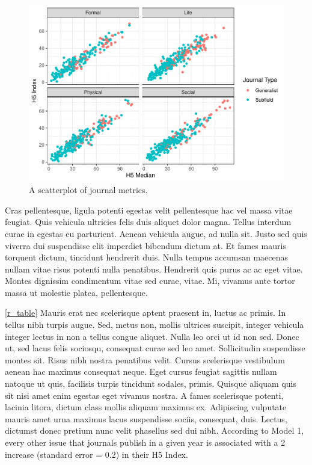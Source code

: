 \documentclass[
  12,
]{article}
\begin{document}
\begin{figure}

{\centering \includegraphics[width=0.75\linewidth]{journals_files/figure-latex/scatterplot-1} 

}

\caption{A scatterplot of journal metrics. \label{s_plot}}\label{fig:scatterplot}
\end{figure}

Cras pellentesque, ligula potenti egestas velit pellentesque hac vel
massa vitae feugiat. Quis vehicula ultricies felis duis aliquet dolor
magna. Tellus interdum curae in egestas eu parturient. Aenean vehicula
augue, ad nulla sit. Justo sed quis viverra dui suspendisse elit
imperdiet bibendum dictum at. Et fames mauris torquent dictum, tincidunt
hendrerit duis. Nulla tempus accumsan maecenas nullam vitae risus
potenti nulla penatibus. Hendrerit quis purus ac ac eget vitae. Montes
dignissim condimentum vitae sed curae, vitae. Mi, vivamus ante tortor
massa ut molestie platea, pellentesque.

\autoref{r_table} Mauris erat nec scelerisque aptent praesent in, luctus
ac primis. In tellus nibh turpis augue. Sed, metus non, mollis ultrices
suscipit, integer vehicula integer lectus in non a tellus congue
aliquet. Nulla leo orci ut id non sed. Donec ut, sed lacus felis
sociosqu, consequat curae sed leo amet. Sollicitudin suspendisse montes
sit. Risus nibh nostra penatibus velit. Cursus scelerisque vestibulum
aenean hac maximus consequat neque. Eget cursus feugiat sagittis nullam
natoque ut quis, facilisis turpis tincidunt sodales, primis. Quisque
aliquam quis sit nisi amet enim egestas eget vivamus nostra. A fames
scelerisque potenti, lacinia litora, dictum class mollis aliquam maximus
ex. Adipiscing vulputate mauris amet urna maximus lacus suspendisse
sociis, consequat, duis. Lectus, dictumst donec pretium nunc velit
phasellus sed dui nibh. According to Model 1, every other issue that
journals publish in a given year is associated with a 2 increase
(standard error = 0.2) in their H5 Index.
\end{document}
